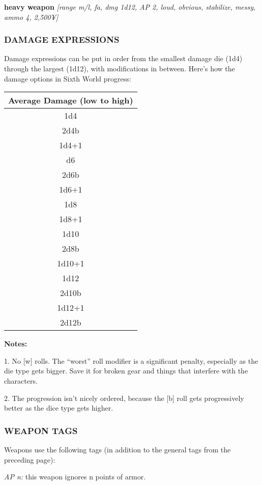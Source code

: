 \documentclass[oneside,10pt]{article}
\begin{document}
\begin{multicols}{2}
\textbf{heavy weapon} \textit{[range m/l, fa, dmg 1d12, AP 2, loud,
obvious, stabilize, messy, ammo 4, 2,500¥]}

\subsubsection{DAMAGE EXPRESSIONS}
Damage expressions can be put in order from the smallest
damage die (1d4) through the largest (1d12), with modifications in between. Here’s how the damage options in Sixth
World progress:

\begin{center}
\begin{tabular}{c}
\toprule
Average Damage (low to high)\\
\midrule
1d4 \\
2d4b \\
1d4+1 \\
d6 \\
2d6b \\
1d6+1 \\
1d8 \\
1d8+1 \\
1d10 \\
2d8b \\
1d10+1 \\
1d12 \\
2d10b \\
1d12+1 \\
2d12b \\
\bottomrule
\end{tabular}
\end{center}

\textbf{Notes:}
\begin{dent}
1. No [w] rolls. The
``worst'' roll modifier is
a significant penalty,
especially as the die type
gets bigger. Save it for
broken gear and things
that interfere with the
characters.

2. The progression isn’t
nicely ordered, because
the [b] roll gets progressively better as the dice
type gets higher.
\end{dent}

\subsubsection{WEAPON TAGS}
Weapons use the following tags (in addition to the general
tags from the preceding page):
\begin{dent}

\textit{AP n:} this weapon ignores n points of armor.


\end{dent}
\end{multicols}
\end{document}

